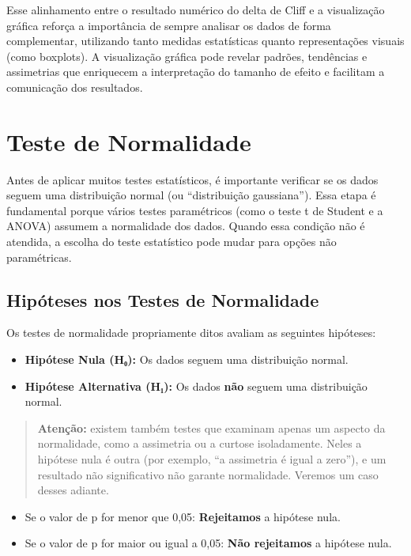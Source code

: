 \documentclass[
]{book}
\providecommand{\tightlist}{%
  \setlength{\itemsep}{0pt}\setlength{\parskip}{0pt}}
\begin{document}
Esse alinhamento entre o resultado numérico do delta de Cliff e a visualização gráfica reforça a importância de sempre analisar os dados de forma complementar, utilizando tanto medidas estatísticas quanto representações visuais (como boxplots). A visualização gráfica pode revelar padrões, tendências e assimetrias que enriquecem a interpretação do tamanho de efeito e facilitam a comunicação dos resultados.

\chapter{Teste de Normalidade}\label{teste-de-normalidade}

Antes de aplicar muitos testes estatísticos, é importante verificar se os dados seguem uma distribuição normal (ou ``distribuição gaussiana''). Essa etapa é fundamental porque vários testes paramétricos (como o teste t de Student e a ANOVA) assumem a normalidade dos dados. Quando essa condição não é atendida, a escolha do teste estatístico pode mudar para opções não paramétricas.

\section{Hipóteses nos Testes de Normalidade}\label{hipuxf3teses-nos-testes-de-normalidade}

Os testes de normalidade propriamente ditos avaliam as seguintes hipóteses:

\begin{itemize}
\tightlist
\item
  \textbf{Hipótese Nula (H₀):} Os dados seguem uma distribuição normal.
\item
  \textbf{Hipótese Alternativa (H₁):} Os dados \textbf{não} seguem uma distribuição normal.
\end{itemize}

\begin{quote}
\textbf{Atenção:} existem também testes que examinam apenas um aspecto da normalidade, como a assimetria ou a curtose isoladamente. Neles a hipótese nula é outra (por exemplo, ``a assimetria é igual a zero''), e um resultado não significativo não garante normalidade. Veremos um caso desses adiante.
\end{quote}

\begin{itemize}
\item
  Se o valor de p for menor que 0,05: \textbf{Rejeitamos} a hipótese nula.
\item
  Se o valor de p for maior ou igual a 0,05: \textbf{Não rejeitamos} a hipótese nula.
\end{itemize}
\end{document}
